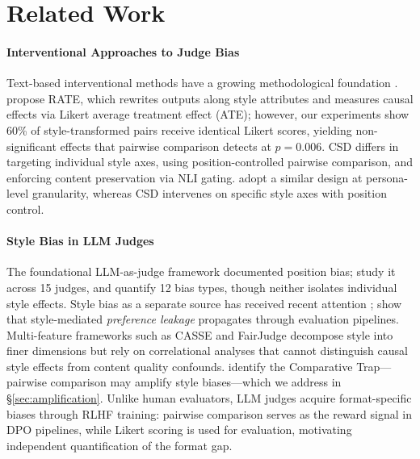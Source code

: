 \section{Related Work}
\label{sec:related_work}

\paragraph{Interventional Approaches to Judge Bias}
Text-based interventional methods have a growing methodological foundation \citep{feder2021causalm,wu2021polyjuice,feder2022causal}.
\citet{reber2025rate} propose RATE, which rewrites outputs along style attributes and measures causal effects via Likert average treatment effect (ATE); however, our experiments show 60\% of style-transformed pairs receive identical Likert scores, yielding non-significant effects that pairwise comparison detects at $p = 0.006$.
CSD differs in targeting individual style axes, using position-controlled pairwise comparison, and enforcing content preservation via NLI gating.
\citet{counterfactual2025rhetorical} adopt a similar design at persona-level granularity, whereas CSD intervenes on specific style axes with position control.

\paragraph{Style Bias in LLM Judges}
The foundational LLM-as-judge framework \citep{zheng2023judging} documented position bias; \citet{shi2024judging} study it across 15 judges, and \citet{ye2024justice} quantify 12 bias types, though neither isolates individual style effects.
Style bias as a separate source has received recent attention \citep{wu2023style,murugadoss2025sos,saito2023verbosity,li2026preference,soumik2026judging}; \citet{li2026preference} show that style-mediated \emph{preference leakage} propagates through evaluation pipelines.
Multi-feature frameworks such as CASSE \citep{casse2026concise} and FairJudge \citep{wang2026fairjudge} decompose style into finer dimensions but rely on correlational analyses that cannot distinguish causal style effects from content quality confounds.
\citet{jeong2025comparative} identify the Comparative Trap---pairwise comparison may amplify style biases---which we address in \S\ref{sec:amplification}.
Unlike human evaluators, LLM judges acquire format-specific biases through RLHF training: pairwise comparison serves as the reward signal in DPO pipelines, while Likert scoring is used for evaluation, motivating independent quantification of the format gap.

